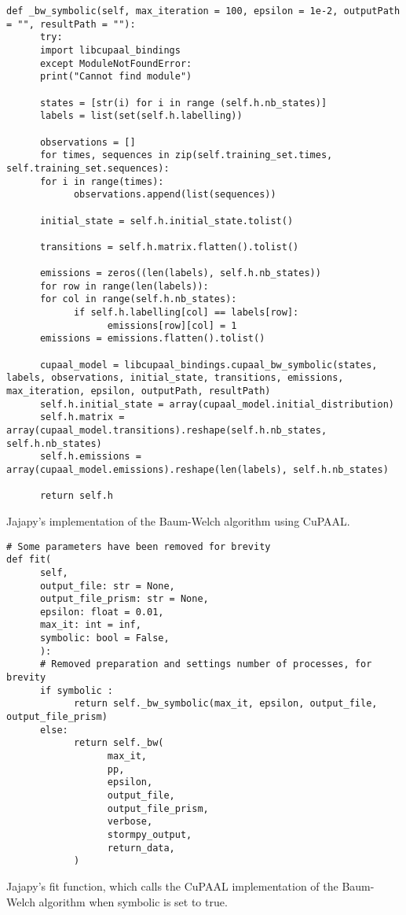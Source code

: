 \begin{listing*}[htb!]
      \begin{verbatim}
def _bw_symbolic(self, max_iteration = 100, epsilon = 1e-2, outputPath = "", resultPath = ""):
      try:
      import libcupaal_bindings
      except ModuleNotFoundError:
      print("Cannot find module")
      
      states = [str(i) for i in range (self.h.nb_states)]
      labels = list(set(self.h.labelling))
      
      observations = []
      for times, sequences in zip(self.training_set.times, self.training_set.sequences):
      for i in range(times):
            observations.append(list(sequences))

      initial_state = self.h.initial_state.tolist()
      
      transitions = self.h.matrix.flatten().tolist()

      emissions = zeros((len(labels), self.h.nb_states))
      for row in range(len(labels)):
      for col in range(self.h.nb_states):
            if self.h.labelling[col] == labels[row]:
                  emissions[row][col] = 1
      emissions = emissions.flatten().tolist()
      
      cupaal_model = libcupaal_bindings.cupaal_bw_symbolic(states, labels, observations, initial_state, transitions, emissions, max_iteration, epsilon, outputPath, resultPath)
      self.h.initial_state = array(cupaal_model.initial_distribution)
      self.h.matrix = array(cupaal_model.transitions).reshape(self.h.nb_states, self.h.nb_states)
      self.h.emissions = array(cupaal_model.emissions).reshape(len(labels), self.h.nb_states)

      return self.h
      \end{verbatim}
      \caption{Jajapy's implementation of the Baum-Welch algorithm using CuPAAL.}
      \label{lst:jajapy-bw-symbolic}
\end{listing*}

\begin{listing*}[htb!]
      \begin{verbatim}
# Some parameters have been removed for brevity
def fit(
      self,
      output_file: str = None,
      output_file_prism: str = None,
      epsilon: float = 0.01,
      max_it: int = inf,
      symbolic: bool = False,
      ):
      # Removed preparation and settings number of processes, for brevity
      if symbolic :
            return self._bw_symbolic(max_it, epsilon, output_file, output_file_prism)
      else:
            return self._bw(
                  max_it,
                  pp,
                  epsilon,
                  output_file,
                  output_file_prism,
                  verbose,
                  stormpy_output,
                  return_data,
            )
      \end{verbatim}
      \caption{Jajapy's fit function, which calls the CuPAAL implementation of the Baum-Welch algorithm when symbolic is set to true.}
      \label{lst:jajapy-fit-cupaal}
\end{listing*}

